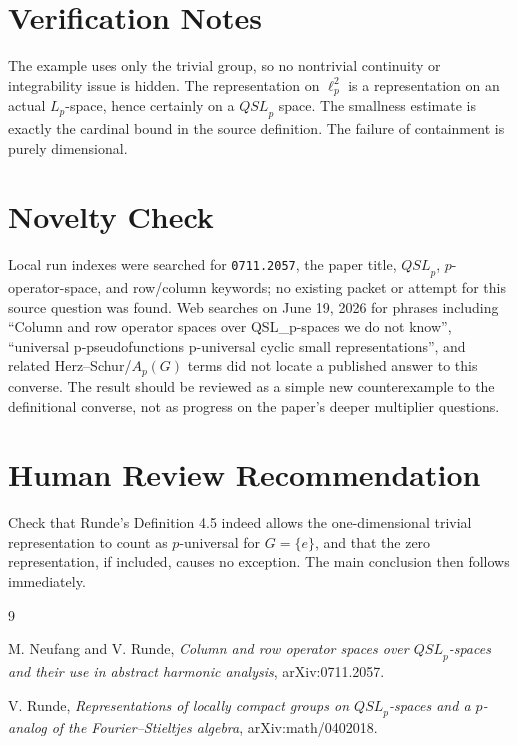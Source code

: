 \documentclass[11pt]{article}
\newcommand{\QSL}{\mathit{QSL}}
\begin{document}
\section*{Verification Notes}

The example uses only the trivial group, so no nontrivial continuity or
integrability issue is hidden.  The representation on \(\ell_p^2\) is a
representation on an actual \(L_p\)-space, hence certainly on a \(\QSL_p\)
space.  The smallness estimate is exactly the cardinal bound in the source
definition.  The failure of containment is purely dimensional.

\section*{Novelty Check}

Local run indexes were searched for \texttt{0711.2057}, the paper title,
\(\QSL_p\), \(p\)-operator-space, and row/column keywords; no existing packet
or attempt for this source question was found.  Web searches on June 19, 2026
for phrases including ``Column and row operator spaces over QSL\_p-spaces we
do not know'', ``universal p-pseudofunctions p-universal cyclic small
representations'', and related Herz--Schur/\(A_p(G)\) terms did not locate a
published answer to this converse.  The result should be reviewed as a simple
new counterexample to the definitional converse, not as progress on the
paper's deeper multiplier questions.

\section*{Human Review Recommendation}

Check that Runde's Definition 4.5 indeed allows the one-dimensional trivial
representation to count as \(p\)-universal for \(G=\{e\}\), and that the
zero representation, if included, causes no exception.  The main conclusion
then follows immediately.

\begin{thebibliography}{9}

M. Neufang and V. Runde,
\emph{Column and row operator spaces over \(\QSL_p\)-spaces and their use in
abstract harmonic analysis},
arXiv:0711.2057.

V. Runde,
\emph{Representations of locally compact groups on \(\QSL_p\)-spaces and a
\(p\)-analog of the Fourier--Stieltjes algebra},
arXiv:math/0402018.

\end{thebibliography}
\end{document}
